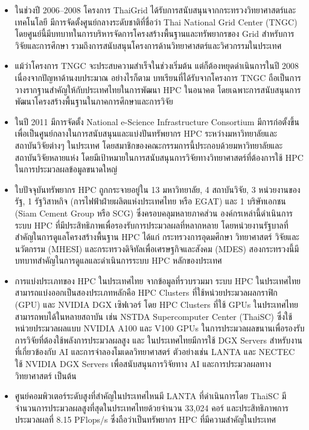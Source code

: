 \documentclass[a4paper,12pt]{extarticle}
\begin{document}
\begin{enumerate}
\begin{itemize}
		\item ในช่วงปี 2006–2008 โครงการ ThaiGrid ได้รับการสนับสนุนจากกระทรวงวิทยาศาสตร์และเทคโนโลยี มีการจัดตั้งศูนย์กลางระดับชาติที่ชื่อว่า Thai National Grid Center (TNGC) โดยศูนย์นี้มีบทบาทในการบริหารจัดการโครงสร้างพื้นฐานและทรัพยากรของ Grid สำหรับการวิจัยและการศึกษา รวมถึงการสนับสนุนโครงการด้านวิทยาศาสตร์และวิศวกรรมในประเทศ
		\item แม้ว่าโครงการ TNGC จะประสบความสำเร็จในช่วงเริ่มต้น แต่ก็ต้องหยุดดำเนินการในปี 2008 เนื่องจากปัญหาด้านงบประมาณ อย่างไรก็ตาม บทเรียนที่ได้รับจากโครงการ TNGC ถือเป็นการวางรากฐานสำคัญให้กับประเทศไทยในการพัฒนา HPC ในอนาคต โดยเฉพาะการสนับสนุนการพัฒนาโครงสร้างพื้นฐานในภาคการศึกษาและการวิจัย
		\item ในปี 2011 มีการจัดตั้ง National e-Science Infrastructure Consortium มีการก่อตั้งขึ้นเพื่อเป็นศูนย์กลางในการสนับสนุนและแบ่งปันทรัพยากร HPC ระหว่างมหาวิทยาลัยและสถาบันวิจัยต่างๆ ในประเทศ โดยสมาชิกของคณะกรรมการนี้ประกอบด้วยมหาวิทยาลัยและสถาบันวิจัยหลายแห่ง โดยมีเป้าหมายในการสนับสนุนการวิจัยทางวิทยาศาสตร์ที่ต้องการใช้ HPC ในการประมวลผลข้อมูลขนาดใหญ่
		\item ใบปัจจุบันทรัพยากร HPC ถูกกระจายอยู่ใน 13 มหาวิทยาลัย, 4 สถาบันวิจัย, 3 หน่วยงานของรัฐ, 1 รัฐวิสาหกิจ (การไฟฟ้าฝ่ายผลิตแห่งประเทศไทย หรือ EGAT) และ 1 บริษัทเอกชน (Siam Cement Group หรือ SCG) ซึ่งครอบคลุมหลายภาคส่วน องค์กรเหล่านี้ดำเนินการระบบ HPC ที่มีประสิทธิภาพเพื่อรองรับการประมวลผลที่หลากหลาย โดยหน่วยงานรัฐบาลที่สำคัญในการดูแลโครงสร้างพื้นฐาน HPC ได้แก่ กระทรวงการอุดมศึกษา วิทยาศาสตร์ วิจัยและนวัตกรรม (MHESI) และกระทรวงดิจิทัลเพื่อเศรษฐกิจและสังคม (MDES) สองกระทรวงนี้มีบทบาทสำคัญในการดูแลและดำเนินการระบบ HPC หลักของประเทศ
		\item การแบ่งประเภทของ HPC ในประเทศไทย จากข้อมูลที่รวบรวมมา ระบบ HPC ในประเทศไทยสามารถแบ่งออกเป็นสองประเภทหลักคือ HPC Clusters ที่ใช้หน่วยประมวลผลกราฟิก (GPU) และ NVIDIA DGX เซิฟเวอร์ โดย HPC Clusters ที่ใช้ GPUs ในประเทศไทยสามารถพบได้ในหลายสถาบัน เช่น NSTDA Supercomputer Center (ThaiSC) ซึ่งใช้หน่วยประมวลผลแบบ NVIDIA A100 และ V100 GPUs ในการประมวลผลขนานเพื่อรองรับการวิจัยที่ต้องใช้พลังการประมวลผลสูง และ ในประเทศไทยมีการใช้ DGX Servers สำหรับงานที่เกี่ยวข้องกับ AI และการจำลองโมเดลวิทยาศาสตร์ ตัวอย่างเช่น LANTA และ NECTEC ใช้ NVIDIA DGX Servers เพื่อสนับสนุนการวิจัยทาง AI และการประมวลผลทางวิทยาศาสตร์ เป็นต้น
		\item ศูนย์คอมพิวเตอร์ระดับสูงที่สำคัญในประเทศไหนมี LANTA ที่ดำเนินการโดย ThaiSC มีจำนวนการประมวลผลสูงที่สุดในประเทศไทยด้วยจำนวน 33,024 คอร์ และประสิทธิภาพการประมวลผลที่ 8.15 PFlops/s ซึ่งถือว่าเป็นทรัพยากร HPC ที่มีความสำคัญในประเทศ

\end{itemize}
\end{enumerate}
\end{document}
